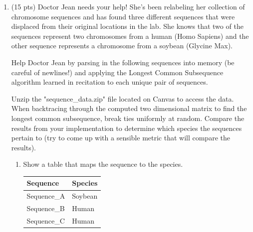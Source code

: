 \documentclass[12pt]{article}
\begin{document}
\renewcommand{\headrulewidth}{0.4pt}


\vspace{2mm}
\noindent
\begin{enumerate}

	\item (15 pts) Doctor Jean needs your help! She's been relabeling her collection of chromosome sequences and has found three different sequences that were displaced from their original locations in the lab. She knows that two of the sequences represent two chromosomes from a human (Homo Sapiens) and the other sequence represents a chromosome from a soybean (Glycine Max).

    Help Doctor Jean by parsing in the following sequences into memory (be careful of newlines!) and applying the Longest Common Subsequence algorithm learned in recitation to each unique pair of sequences.
    
    Unzip the "sequence\_data.zip" file located on Canvas to access the data. When backtracing through the computed two dimensional matrix to find the longest common subsequence, break ties uniformly at random. Compare the results from your implementation to determine which species the sequences pertain to (try to come up with a sensible metric that will compare the results). \begin{enumerate}
    \item Show a table that maps the sequence to the species.

	{\color{blue}

		\begin{table}[h!]
		\centering
		\begin{tabular}{|l|l|}
		\hline
		\textbf{Sequence} & \textbf{Species} \\ \hline
		Sequence\_A        & Soybean          \\ \hline
		Sequence\_B        & Human            \\ \hline
		Sequence\_C        & Human            \\ \hline
		\end{tabular}
		\end{table}

}
\end{enumerate}
\end{enumerate}
\end{document}
